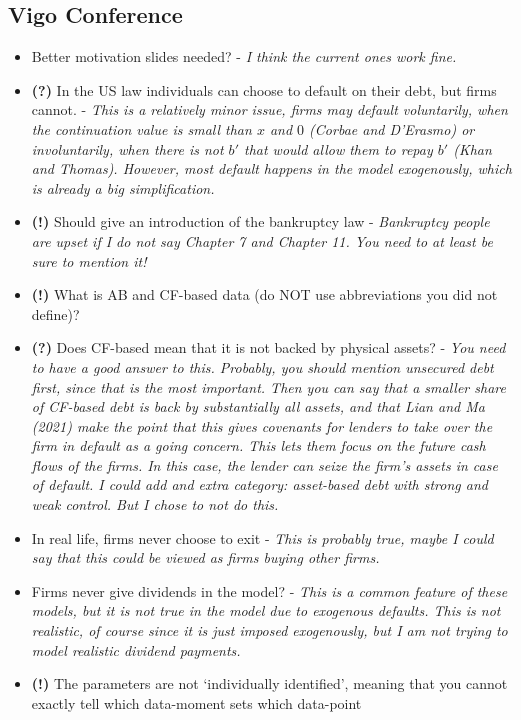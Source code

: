 \documentclass[12pt]{article}
\begin{document}
\subsection*{Vigo Conference}
\begin{itemize}
    \item Better motivation slides needed? - \textit{I think the current ones work fine. }
    \item \textbf{(?)} In the US law individuals can choose to default on their debt, but firms cannot. - \textit{This is a relatively minor issue, firms may default voluntarily, when the continuation value is small than $x$ and $0$ (Corbae and D'Erasmo) or involuntarily, when there is not $b'$ that would allow them to repay $b'$ (Khan and Thomas). However, most default happens in the model exogenously, which is already a big simplification.}
    \item \textbf{(!)} Should give an introduction of the bankruptcy law - \textit{Bankruptcy people are upset if I do not say Chapter 7 and Chapter 11. You need to at least be sure to mention it!}
    \item \textbf{(!)} What is AB and CF-based data (do NOT use abbreviations you did not define)? 
    \item \textbf{(?)} Does CF-based mean that it is not backed by physical assets? - \textit{You need to have a good answer to this. Probably, you should mention unsecured debt first, since that is the most important. Then you can say that a smaller share of CF-based debt is back by substantially all assets, and that Lian and  Ma (2021) make the point that this gives covenants for lenders to take over the firm in default as a going concern. This lets them focus on the future cash flows of the firms. In this case, the lender can seize the firm's assets in case of default. I could add and extra category: asset-based debt with strong and weak control. But I chose to not do this.}
    \item In real life, firms never choose to exit - \textit{This is probably true, maybe I could say that this could be viewed as firms buying other firms.}
    \item Firms never give dividends in the model? - \textit{This is a common feature of these models, but it is not true in the model due to exogenous defaults. This is not realistic, of course since it is just imposed exogenously, but I am not trying to model realistic dividend payments.}
    \item \textbf{(!)} The parameters are not `individually identified', meaning that you cannot exactly tell which data-moment sets which data-point

\end{itemize}
\end{document}
